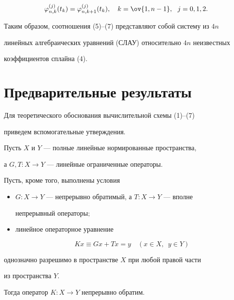 \begin{equation} 


\varphi^{(j)}_{n,k}(t_k)=\varphi^{(j)}_{n,k+1}(t_k),\quad 


k=\ov{1,n-1},\ \ j=0,1,2. 


\end{equation} 


 


Таким образом, соотношения (5)--(7) представляют собой систему из $4n$ 


линейных алгебраических уравнений (СЛАУ) относительно $4n$ неизвестных 


коэффициентов сплайна (4). 


 


 


\section{Предварительные результаты} 


 


Для теоретического обоснования вычислительной схемы (1)--(7) 


приведем вспомогательные утверждения. 


 


\begin{lem} 


Пусть $X$ и $Y$ --- полные линейные нормированные пространства, 


а $G, T:X\to Y$ --- линейные ограниченные операторы. 


Пусть, кроме того, выполнены условия 


\begin{itemize} 


\item[1)] $G:X\to Y$ --- непрерывно обратимый, а $T:X\to Y$ --- вполне 


непрерывный операторы\/$;$ 


\item[2)] линейное операторное уравнение 


\begin{equation} 


K x\equiv G x+T x=y\quad (x\in X,\ \; y\in Y) 


\end{equation} 


\end{itemize} 


однозначно разрешимо в пространстве $X$ при любой правой части 


из пространства $Y$. 


 


Тогда оператор $K:X\to Y$ непрерывно обратим. 


\end{lem} 


